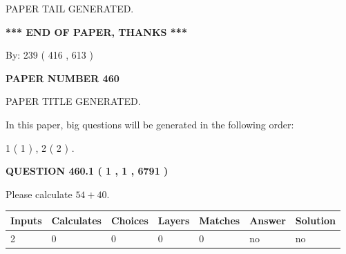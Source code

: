 \documentclass[12pt]{article}
\begin{document}
   
   
\vspace{2.0in} PAPER TAIL GENERATED.
   
   
   
   
\vspace{1.0in} 
{\textbf{\large{ *** END OF PAPER, THANKS *** }}} 
   
   
\hspace{1.0in} By: 
 239 ( 416 ,  613 )
   
   
   
   
\newpage 
\setcounter{page}{ 
   460001 } 
   
   
   
   
 {\textbf{ \Large{ PAPER NUMBER  460  }}}
   
   
\vspace{0.2in}
   
   
   
   
   
   
   
   
 \vspace{0.2in}
 
 
 
 
   
   
 PAPER TITLE GENERATED.
   
   
   
\vspace{0.2in}
   
In this paper, big questions will be generated in the following order: 
   
   
   1 ( 1 )
 ,
   2 ( 2 )
 .
  
\vspace{0.2in}
  
{\textbf{\Large{QUESTION
460.1 
 ( 1 , 1 , 6791 )
}}}
  
  
 
Please calculate $ %
54 +  %
40 $.
 
 
   
   
   
   
\noindent\begin{tabular}{|l|l|l|l|l|l|l|}
 \hline
Inputs & Calculates & Choices & Layers & Matches & Answer & Solution \\ \hline
 2  & 
 0  & 
 0
  & 
 0  & 
 0  & 
  no & 
  no 
  \\ \hline
 \end{tabular}
   
\end{document}

